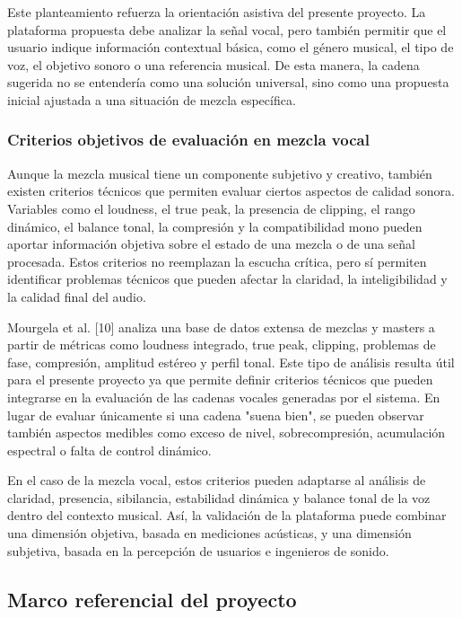 Este planteamiento refuerza la orientación asistiva del presente proyecto. La plataforma propuesta debe analizar la señal vocal, pero también permitir que el usuario indique información contextual básica, como el género musical, el tipo de voz, el objetivo sonoro o una referencia musical. De esta manera, la cadena sugerida no se entendería como una solución universal, sino como una propuesta inicial ajustada a una situación de mezcla específica.

\subsubsection*{Criterios objetivos de evaluación en mezcla vocal}

Aunque la mezcla musical tiene un componente subjetivo y creativo, también existen criterios técnicos que permiten evaluar ciertos aspectos de calidad sonora. Variables como el loudness, el true peak, la presencia de clipping, el rango dinámico, el balance tonal, la compresión y la compatibilidad mono pueden aportar información objetiva sobre el estado de una mezcla o de una señal procesada. Estos criterios no reemplazan la escucha crítica, pero sí permiten identificar problemas técnicos que pueden afectar la claridad, la inteligibilidad y la calidad final del audio.

Mourgela et al. [10] analiza una base de datos extensa de mezclas y masters a partir de métricas como loudness integrado, true peak, clipping, problemas de fase, compresión, amplitud estéreo y perfil tonal. Este tipo de análisis resulta útil para el presente proyecto ya que permite definir criterios técnicos que pueden integrarse en la evaluación de las cadenas vocales generadas por el sistema. En lugar de evaluar únicamente si una cadena "suena bien", se pueden observar también aspectos medibles como exceso de nivel, sobrecompresión, acumulación espectral o falta de control dinámico.

En el caso de la mezcla vocal, estos criterios pueden adaptarse al análisis de claridad, presencia, sibilancia, estabilidad dinámica y balance tonal de la voz dentro del contexto musical. Así, la validación de la plataforma puede combinar una dimensión objetiva, basada en mediciones acústicas, y una dimensión subjetiva, basada en la percepción de usuarios e ingenieros de sonido.

\subsection*{Marco referencial del proyecto}

